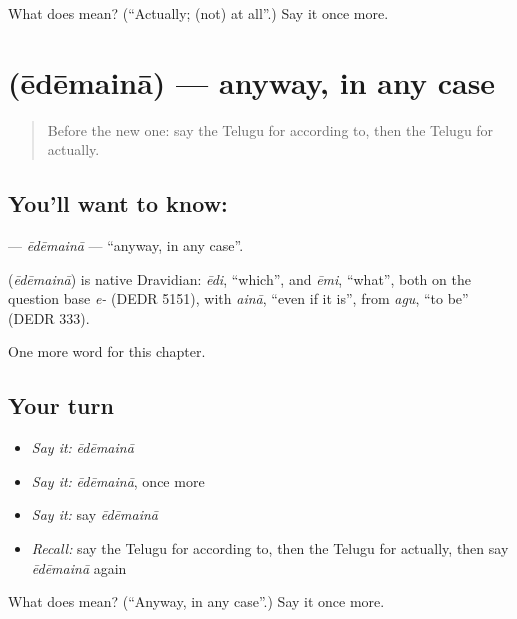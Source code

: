\begin{tcolorbox}[breakable,colback=teal!4,colframe=teal!35!black,title={Before you move on}]
What does  mean? (\textquotedblleft{}Actually; (not) at all\textquotedblright{}.) Say it once more.
\end{tcolorbox}
\section[\texorpdfstring{\te{ఏదేమైనా} (ēdēmainā)}{ఏదేమైనా (ēdēmainā)}]{ (ēdēmainā) — anyway, in any case}

\label{lesson:TE-C177-edemaina}



\begin{quote}
Before the new one: say the Telugu for according to, then the Telugu for actually.
\end{quote}

\subsection*{You'll want to know: }
\textbf{} — \emph{ēdēmainā} — \textquotedblleft{}anyway, in any case\textquotedblright{}.

\begin{cousinweb}
\textbf{} (\emph{ēdēmainā}) is native Dravidian: \emph{ēdi}, \textquotedblleft{}which\textquotedblright{}, and \emph{ēmi}, \textquotedblleft{}what\textquotedblright{}, both on the question base \emph{e-} (DEDR 5151), with \emph{ainā}, \textquotedblleft{}even if it is\textquotedblright{}, from \emph{agu}, \textquotedblleft{}to be\textquotedblright{} (DEDR 333).
\end{cousinweb}

\begin{grammarlens}[title={What you've built}]
One more word for this chapter.
\end{grammarlens}

\subsection*{Your turn}
\begin{itemize}
\raggedright
  \item \emph{Say it:} \emph{ēdēmainā}
  \item \emph{Say it:} \emph{ēdēmainā}, once more
  \item \emph{Say it:} say \emph{ēdēmainā}
  \item \emph{Recall:} say the Telugu for according to, then the Telugu for actually, then say \emph{ēdēmainā} again
\end{itemize}

\begin{tcolorbox}[breakable,colback=teal!4,colframe=teal!35!black,title={Before you move on}]
What does  mean? (\textquotedblleft{}Anyway, in any case\textquotedblright{}.) Say it once more.
\end{tcolorbox}
